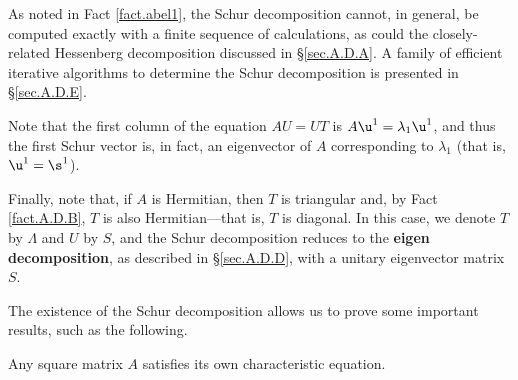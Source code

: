 As noted in Fact \ref{fact.abel1}, the Schur decomposition cannot, in general, be
computed exactly with a finite sequence of calculations, as could the
closely-related Hessenberg decomposition discussed in \S \ref{sec.A.D.A}.
A family of efficient iterative algorithms to determine
the Schur decomposition is presented in \S \ref{sec.A.D.E}.

Note that the first column of the equation $AU=UT$ is $A\u^1=\lambda_1\u^1$, and thus the
first Schur vector is, in fact, an eigenvector of $A$ corresponding to $\lambda_1$ (that is, $\u^1=\s^1$).

Finally, note that, if $A$ is Hermitian, then $T$ is triangular and,
by Fact \ref{fact.A.D.B}, $T$ is also Hermitian---that is, $T$ is diagonal.  In
this case, we denote $T$ by $\Lambda$ and $U$ by $S$, and the Schur
decomposition reduces to the {\bf eigen decomposition}, as described
in \S \ref{sec.A.D.D}, with a unitary eigenvector matrix $S$.


\noindent The existence of the Schur decomposition allows us to prove some
important results, such as the following.

\begin{fact} \label{fact.A.D.C.Bc} Any square
matrix $A$ satisfies its own characteristic equation.
\end{fact}

